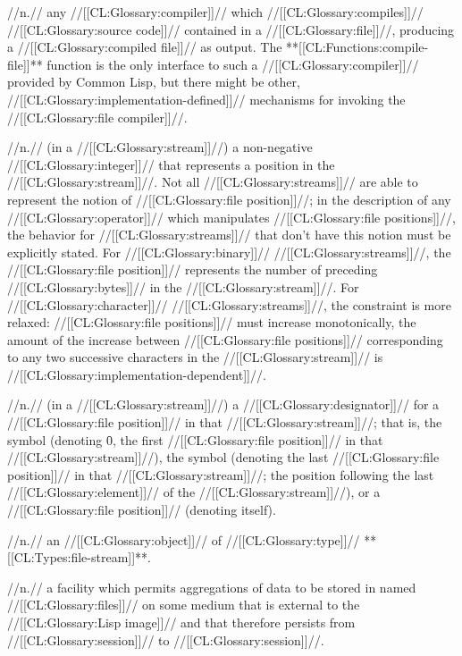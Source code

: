  //n.// any //[[CL:Glossary:compiler]]// which //[[CL:Glossary:compiles]]// //[[CL:Glossary:source code]]// contained in a //[[CL:Glossary:file]]//, producing a //[[CL:Glossary:compiled file]]// as output. The **[[CL:Functions:compile-file]]** function is the only interface to such a //[[CL:Glossary:compiler]]// provided by Common Lisp, but there might be other, //[[CL:Glossary:implementation-defined]]// mechanisms for invoking the //[[CL:Glossary:file compiler]]//.

 //n.// (in a //[[CL:Glossary:stream]]//) a non-negative //[[CL:Glossary:integer]]// that represents a position in the //[[CL:Glossary:stream]]//. Not all //[[CL:Glossary:streams]]// are able to represent the notion of //[[CL:Glossary:file position]]//; in the description of any //[[CL:Glossary:operator]]// which manipulates //[[CL:Glossary:file positions]]//, the behavior for //[[CL:Glossary:streams]]// that don't have this notion must be explicitly stated. For //[[CL:Glossary:binary]]// //[[CL:Glossary:streams]]//, the //[[CL:Glossary:file position]]// represents the number of preceding //[[CL:Glossary:bytes]]// in the //[[CL:Glossary:stream]]//. For //[[CL:Glossary:character]]// //[[CL:Glossary:streams]]//, the constraint is more relaxed: //[[CL:Glossary:file positions]]// must increase monotonically, the amount of the increase between //[[CL:Glossary:file positions]]// corresponding to any two successive characters in the //[[CL:Glossary:stream]]// is //[[CL:Glossary:implementation-dependent]]//.

 //n.// (in a //[[CL:Glossary:stream]]//) a //[[CL:Glossary:designator]]// for a //[[CL:Glossary:file position]]// in that //[[CL:Glossary:stream]]//; that is, the symbol  (denoting \f{0}, the first //[[CL:Glossary:file position]]// in that //[[CL:Glossary:stream]]//), the symbol  (denoting the last //[[CL:Glossary:file position]]// in that //[[CL:Glossary:stream]]//; \ie the position following the last //[[CL:Glossary:element]]// of the //[[CL:Glossary:stream]]//), or a //[[CL:Glossary:file position]]// (denoting itself).

 //n.// an //[[CL:Glossary:object]]// of //[[CL:Glossary:type]]// **[[CL:Types:file-stream]]**.

 //n.// a facility which permits aggregations of data to be stored in named //[[CL:Glossary:files]]// on some medium that is external to the //[[CL:Glossary:Lisp image]]// and that therefore persists from //[[CL:Glossary:session]]// to //[[CL:Glossary:session]]//.


